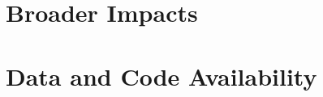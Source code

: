 \documentclass{article}
\begin{document}
\section*{Broader Impacts}


\section*{Data and Code Availability}


\clearpage



\clearpage
\appendix







\clearpage

\end{document}
